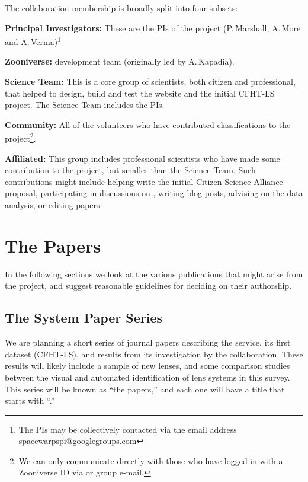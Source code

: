 \documentclass[a4paper]{article}
\begin{document}
The collaboration membership is broadly split into four subsets:

\begin{description}

\item{\bf Principal Investigators:} These are the PIs of the \sw project (P.\,Marshall, 
A.\,More and A.\,Verma)\footnote{The PIs may be collectively contacted via the email address \href{mailto:spacewarpspi@googlegroups.com}{spacewarpspi@googlegroups.com}}

\item{\bf Zooniverse:} \sw development team (originally led by
A.\,Kapadia).

\item{\bf Science Team:} This is a core group of scientists, both citizen and
professional, that helped to design, build and test the \sw website
and the initial CFHT-LS project. The Science Team includes the \sw PIs.

\item{\bf Community:} All of the volunteers who have contributed
classifications to the project\footnote{We can only communicate directly with those who have logged in with a Zooniverse ID via \Talk or group e-mail.}.

\item{\bf Affiliated:} This group includes professional scientists who have made some contribution to the \sw project, but smaller than the Science Team. Such contributions might include helping write the initial Citizen Science Alliance proposal, participating in discussions on
\Talk, writing \sw blog posts, advising on the data analysis, or editing
papers.

\end{description}


\section{The \SW Papers}

In the following sections we look at the various publications that might
arise from the \sw project, and suggest reasonable guidelines for
deciding on their authorship. 

\subsection{The \sw System Paper Series}
\label{sec:series}

We are planning a short series of journal papers describing the \sw service,
its first dataset (CFHT-LS), and results from its investigation by the
collaboration. These results will likely include a sample of new lenses, and
some comparison studies between the visual and automated identification of
lens systems in this survey. This series will be known as ``the \sw papers,''
and each one will have a title that starts with ``\sw.''
\end{document}
